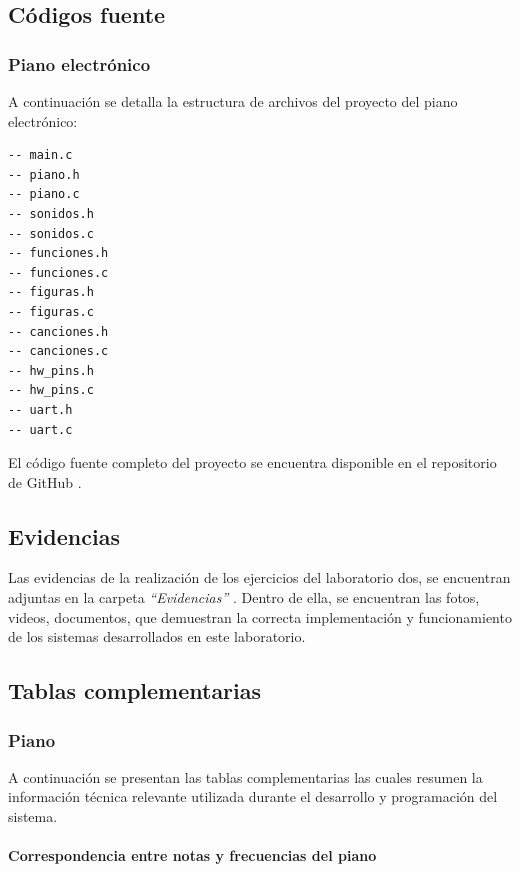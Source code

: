 \subsection{Códigos fuente}

\subsubsection{Piano electrónico}
A continuación se detalla la estructura de archivos del proyecto del piano electrónico:

\begin{verbatim}
-- main.c
-- piano.h
-- piano.c
-- sonidos.h
-- sonidos.c
-- funciones.h
-- funciones.c
-- figuras.h
-- figuras.c
-- canciones.h
-- canciones.c
-- hw_pins.h
-- hw_pins.c
-- uart.h
-- uart.c

\end{verbatim}

El código fuente completo del proyecto se encuentra disponible en el repositorio de GitHub \cite{utec_tecmicro}.

\subsection{Evidencias}

Las evidencias de la realización de los ejercicios del laboratorio dos, se encuentran adjuntas en la carpeta \textit{“Evidencias”} \cite{github_evidencias_lab2}. Dentro de ella, se encuentran las fotos, videos, documentos, que demuestran la correcta implementación y funcionamiento de los sistemas desarrollados en este laboratorio.

\vspace{0.3cm}

\subsection{Tablas complementarias}

\subsubsection{Piano}
A continuación se presentan las tablas complementarias las cuales resumen la información técnica relevante utilizada durante el desarrollo y programación del sistema.

\vspace{0.5cm}

\paragraph{Correspondencia entre notas y frecuencias del piano}

